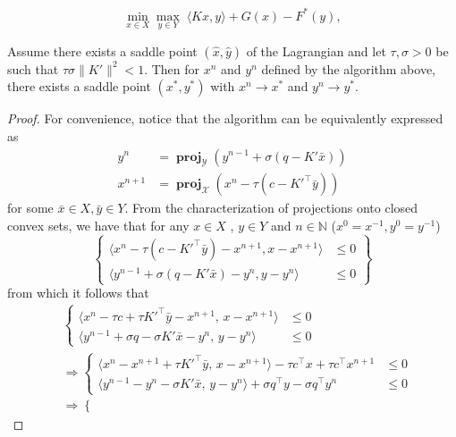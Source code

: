 \documentclass[10pt,a4paper]{amsart}
\DeclareMathOperator*{\proj}{\textbf{proj}}
\begin{document}
\begin{equation}
    \min_{x \in X} \max_{y \in Y} \; \langle Kx, y \rangle + G(x) - F^*(y),
    \label{eq:saddle-point}
\end{equation}

\begin{theorem}
    Assume there exists a saddle point $(\hat{x},\hat{y})$ of the Lagrangian and let $\tau,\sigma >0$ be such that $\tau\sigma\|K'\|^2<1$. Then for $x^n$ and $y^n$ defined by the algorithm above, there exists a saddle point $(x^*,y^*)$ with $x^n \to x^*$ and $y^n \to y^*$.
\end{theorem}

\begin{proof}
    For convenience, notice that the algorithm can be equivalently expressed as
    \begin{align*}
        y^{n} &= \proj_{\mathcal{Y}}(y^{n-1} + \sigma(q-K'\bar{x}))\\
        x^{n+1} &= \proj_{\mathcal{X}}(x^n-\tau(c-K'^\top \bar{y}))
    \end{align*}
    for some $\bar{x} \in X, \bar{y}\in Y$.
    From the characterization of projections onto closed convex sets, we have that for any $x \in X$ , $y \in Y$ and \(n \in \mathbb{N}\) (\(x^0=x^{-1},y^0=y^{-1}\))
    \[
\left\{
\begin{aligned}
    \langle x^n-\tau(c-K'^\top \bar{y})-x^{n+1}, x -x^{n+1}\rangle &\leq 0 \\
    \langle y^{n-1}+\sigma(q-K'\bar{x})-y^{n}, y -y^{n}\rangle &\leq 0
\end{aligned}
\right\}
\]
    from which it follows that     
\[
\begin{aligned}
&\left\{
\begin{aligned}
\langle x^n - \tau c + \tau K'^\top \bar{y} - x^{n+1},\, x - x^{n+1} \rangle &\leq 0 \\
\langle y^{n-1} + \sigma q - \sigma K' \bar{x} - y^{n},\, y - y^{n} \rangle &\leq 0
\end{aligned}
\right. \\[1ex]
&\Rightarrow
\left\{
\begin{aligned}
\langle x^n - x^{n+1} + \tau K'^\top \bar{y},\, x - x^{n+1} \rangle - \tau c^\top x + \tau c^\top x^{n+1} &\leq 0 \\
\langle y^{n-1} - y^{n} - \sigma K' \bar{x},\, y - y^{n} \rangle + \sigma q^\top y - \sigma q^\top y^{n} &\leq 0
\end{aligned}
\right. \\[1ex]
&\Rightarrow
\left\{

\end{aligned}\]
\end{proof}
\end{document}
